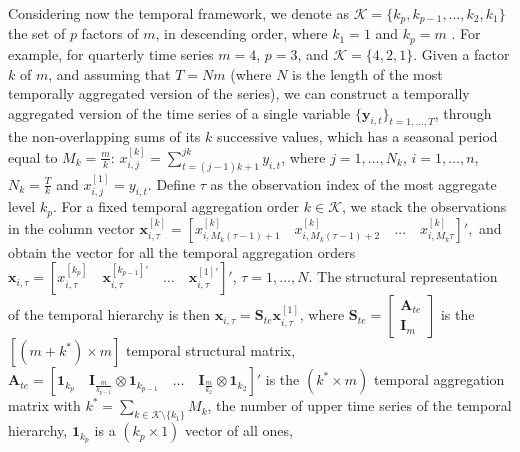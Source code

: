 \documentclass[review, 11pt]{elsarticle}
\newcommand{\Unovet}{\bm{1}}
\newcommand{\xvet}{\bm{x}}
\newcommand{\yvet}{\bm{y}}
\newcommand{\Avet}{\bm{A}}
\newcommand{\Ivet}{\bm{I}}
\newcommand{\Svet}{\bm{S}}
\theoremstyle{definition}
\begin{document}
Considering now the temporal framework, we denote as $\mathcal{K} = \{ k_p , k_{p-1}, \dots, k_2, k_1 \}$ the set of $p$ factors of $m$, in descending order, where $k_1= 1$ and $k_p= m$ \citep{athanasopoulos2017}. {\color{blue}For example, for quarterly time series $m = 4$, $p = 3$, and $\mathcal{K} = \{4,2,1\}$.}
Given a factor $k$ of $m$, and assuming that $T = N m$ (where $N$ is the length of the most temporally aggregated version of the series), we can construct a temporally aggregated version of the time series of a single variable $\{\yvet_{i,t}\}_{t = 1, \dots, T}$, through the non-overlapping sums of its $k$ successive values, which has a seasonal period equal to $M_k= \displaystyle\frac{m}{k}$: $x_{i,j}^{[k]} = \displaystyle\sum_{t=(j-1)k+1}^{jk} y_{i,t}$, where $j = 1,\dots, N_k$, $i = 1,\dots,n$, $N_k = \displaystyle\frac{T}{k}$ and $x_{i,j}^{[1]}=y_{i,t}$. Define $\tau$ as the observation index of the most aggregate level $k_p$. For a fixed temporal aggregation order $k \in \mathcal{K}$, we stack the observations in the column vector $\xvet_{i,\tau}^{[k]} = \left[x_{i,M_k(\tau-1)+1}^{[k]} \quad x_{i,M_k(\tau-1)+2}^{[k]} \quad \dots \quad x_{i,M_k\tau}^{[k]}\right]',$ and obtain the vector for all the temporal aggregation orders $\xvet_{i,\tau} = \left[x_{i,\tau}^{[k_p]} \quad \xvet_{i,\tau}^{[k_{p-1}]\prime} \quad \dots \quad \xvet_{i,\tau}^{[1]\prime} \right]'$, $\tau = 1,\dots,N$. The structural representation of the temporal hierarchy \citep{athanasopoulos2017} is then $\xvet_{i,\tau} = \Svet_{te}\xvet_{i,\tau}^{[1]}$, where $\Svet_{te} = \left[\begin{array}{c}
	\Avet_{te} \\[-0.25cm]
	\Ivet_{m}
\end{array}\right]$ is the $[(m+k^\ast) \times m]$ temporal structural matrix, $\Avet_{te} = \left[\Unovet_{k_p} \quad \Ivet_{\frac{m}{k_{p-1}}} \otimes \Unovet_{k_{p-1}} \quad \dots \quad \Ivet_{\frac{m}{k_{2}}}  \otimes \Unovet_{k_2} \right]'$
is the $(k^\ast \times m)$ temporal aggregation matrix with $k^\ast = \displaystyle\sum_{k \in \mathcal{K}\setminus\{k_1\}} M_k$, the number of upper time series of the temporal hierarchy, {\color{blue} $\Unovet_{k_p}$ is a $(k_p \times 1)$ vector of all ones},
\end{document}
